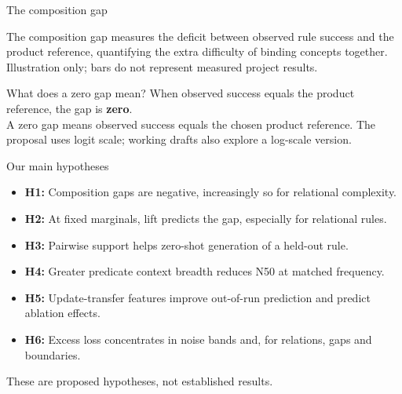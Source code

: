 \documentclass[aspectratio=169,11pt]{beamer}
\newcommand{\captionnote}[1]{{\scriptsize\color{gray}#1}}
\begin{document}
\begin{frame}{The composition gap}
\begin{center}\end{center}
\vspace{1mm}
\normalsize The composition gap measures the deficit between observed rule success and the product reference, quantifying the extra difficulty of binding concepts together.
\vspace{1mm}\\\captionnote{Illustration only; bars do not represent measured project results.}
\end{frame}

\begin{frame}{What does a zero gap mean?}
\large When observed success equals the product reference, the gap is \textbf{zero}.
\vspace{3mm}\\
\normalsize A zero gap means observed success equals the chosen product reference. The proposal uses logit scale; working drafts also explore a log-scale version.
\end{frame}

\begin{frame}{Our main hypotheses}
\begin{itemize}\small
\item \textbf{H1:} Composition gaps are negative, increasingly so for relational complexity.
\item \textbf{H2:} At fixed marginals, lift predicts the gap, especially for relational rules.
\item \textbf{H3:} Pairwise support helps zero-shot generation of a held-out rule.
\item \textbf{H4:} Greater predicate context breadth reduces N50 at matched frequency.
\item \textbf{H5:} Update-transfer features improve out-of-run prediction and predict ablation effects.
\item \textbf{H6:} Excess loss concentrates in noise bands and, for relations, gaps and boundaries.
\end{itemize}
\small These are proposed hypotheses, not established results.
\end{frame}
\end{document}
